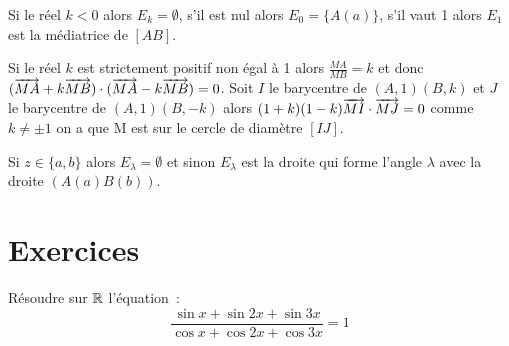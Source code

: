 Si le réel \(k<0\) alors \(E_k=\emptyset\), s'il est nul alors \(E_0=\{A(a)\}\), s'il vaut 1 alors \(E_1\) est la médiatrice de \([AB]\).

Si le réel \(k\) est strictement positif non égal à 1 alors \(\frac{MA}{MB}=k\) et donc \((\overrightarrow{MA}+k\overrightarrow{MB}) \cdot (\overrightarrow{MA}-k\overrightarrow{MB})=0\). Soit \(I\) le barycentre de \((A,1)(B,k)\) et \(J\) le barycentre de \((A,1)(B,-k)\) alors \((1+k)(1-k) \overrightarrow{MI} \cdot \overrightarrow{MJ} =0\) comme \(k \neq \pm 1\) on a que M est sur le cercle de diamètre \([IJ]\).

Si \(z \in \{a,b\}\) alors \(E_\lambda=\emptyset\) et sinon \(E_\lambda\) est la droite qui forme l'angle \(\lambda\) avec la droite \((A(a)B(b))\).
\section{Exercices}
\begin{exercice}
Résoudre sur \(\mathbb{R}\) l'équation~:
\begin{equation}
    \frac{\sin x + \sin 2x + \sin 3x}{\cos x + \cos 2x + \cos 3x} = 1
\end{equation}
\end{exercice}
